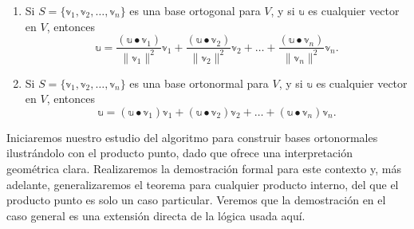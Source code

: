 \begin{theorem}{}{}
    \begin{enumerate}[label=\alph*), topsep=6pt, itemsep=0pt]
        \item Si $S = \{\mathbb{v}_1, \mathbb{v}_2, \dots, \mathbb{v}_n\}$ es una base ortogonal para $V$, y si $\mathbb{u}$ es cualquier vector en $V$, entonces
        $$\mathbb{u} = \frac{(\mathbb{u} \bullet \mathbb{v}_1)}{\|\mathbb{v}_1\|^2} \mathbb{v}_1 + \frac{(\mathbb{u} \bullet \mathbb{v}_2)}{\|\mathbb{v}_2\|^2} \mathbb{v}_2 + \dots + \frac{(\mathbb{u} \bullet \mathbb{v}_n)}{\|\mathbb{v}_n\|^2} \mathbb{v}_n.$$
        \item Si $S = \{\mathbb{v}_1, \mathbb{v}_2, \dots, \mathbb{v}_n\}$ es una base ortonormal para $V$, y si $\mathbb{u}$ es cualquier vector en $V$, entonces
        $$\mathbb{u} = (\mathbb{u} \bullet \mathbb{v}_1) \mathbb{v}_1 + (\mathbb{u} \bullet \mathbb{v}_2) \mathbb{v}_2 + \dots + (\mathbb{u} \bullet \mathbb{v}_n) \mathbb{v}_n.$$
    \end{enumerate}
\end{theorem}

Iniciaremos nuestro estudio del algoritmo para construir bases ortonormales ilustrándolo con el producto punto, dado que ofrece una interpretación geométrica clara. Realizaremos la demostración formal para este contexto y, más adelante, generalizaremos el teorema para cualquier producto interno, del que el producto punto es solo un caso particular. Veremos que la demostración en el caso general es una extensión directa de la lógica usada aquí.

